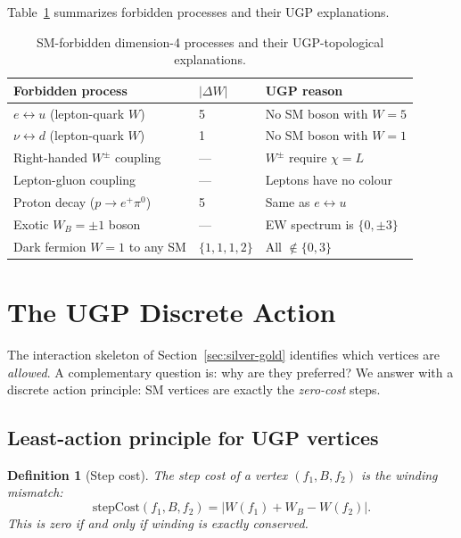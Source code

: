\documentclass[12pt]{article}
\newtheorem{definition}[theorem]{Definition}
\theoremstyle{remark}
\begin{document}
Table~\ref{tab:forbidden} summarizes forbidden processes and their UGP
explanations.

\begin{table}[h]
\centering
\begin{tabular}{lll}
\toprule
Forbidden process & $|\Delta W|$ & UGP reason \\
\midrule
$e \leftrightarrow u$ (lepton-quark $W$) & 5 & No SM boson with $W = 5$ \\
$\nu \leftrightarrow d$ (lepton-quark $W$) & 1 & No SM boson with $W = 1$ \\
Right-handed $W^\pm$ coupling & --- & $W^\pm$ require $\chi = L$ \\
Lepton-gluon coupling & --- & Leptons have no colour \\
Proton decay ($p \to e^+ \pi^0$) & 5 & Same as $e \leftrightarrow u$ \\
Exotic $W_B = \pm 1$ boson & --- & EW spectrum is $\{0, \pm 3\}$ \\
Dark fermion $W = 1$ to any SM & $\{1,1,1,2\}$ & All $\notin \{0,3\}$ \\
\bottomrule
\end{tabular}
\caption{SM-forbidden dimension-4 processes and their UGP-topological explanations.}
\label{tab:forbidden}
\end{table}

\section{The UGP Discrete Action}
\label{sec:action}

The interaction skeleton of Section~\ref{sec:silver-gold} identifies which
vertices are \emph{allowed}.  A complementary question is: why are they
preferred?  We answer with a discrete action principle: SM vertices are
exactly the \emph{zero-cost} steps.

\subsection{Least-action principle for UGP vertices}

\begin{definition}[Step cost]
The \emph{step cost} of a vertex $(f_1, B, f_2)$ is the winding mismatch:
\[
  \mathrm{stepCost}(f_1, B, f_2) = |W(f_1) + W_B - W(f_2)|.
\]
This is zero if and only if winding is exactly conserved.
\end{definition}
\end{document}
